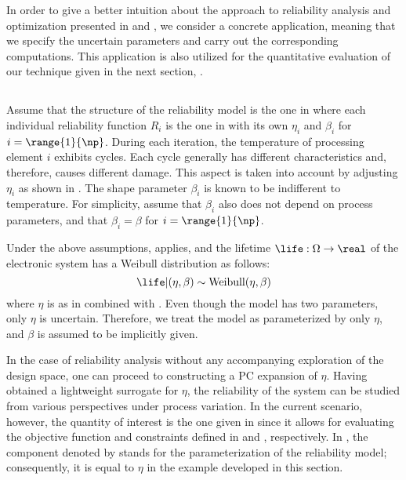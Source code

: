 In order to give a better intuition about the approach to reliability analysis
and optimization presented in  and
, we consider a concrete application,
meaning that we specify the uncertain parameters and carry out the corresponding
computations. This application is also utilized for the quantitative evaluation
of our technique given in the next section, .

\subsection{\problemtitle}

Assume that the structure of the reliability model is the one in
 where each individual reliability function $R_i$ is the
one in  with its own $\eta_i$ and $\beta_i$ for $i =
\range{1}{\np}$. During each iteration, the temperature of processing element
$i$ exhibits  cycles. Each cycle generally has different characteristics
and, therefore, causes different damage. This aspect is taken into account by
adjusting $\eta_i$ as shown in . The shape parameter
$\beta_i$ is known to be indifferent to temperature. For simplicity, assume that
$\beta_i$ also does not depend on process parameters, and that $\beta_i = \beta$
for $i = \range{1}{\np}$.

Under the above assumptions,  applies, and the
lifetime $\life: \Omega \to \real$ of the electronic system has a Weibull
distribution as follows:
\[
  \life | (\eta, \beta) \sim \mathrm{Weibull}(\eta, \beta)
\]
where $\eta$ is as in  combined with
. Even though the model has two parameters, only
$\eta$ is uncertain. Therefore, we treat the model as parameterized by only
$\eta$, and $\beta$ is assumed to be implicitly given.

In the case of reliability analysis without any accompanying exploration of the
design space, one can proceed to constructing a \ac{PC} expansion of $\eta$.
Having obtained a lightweight surrogate for $\eta$, the reliability of the
system can be studied from various perspectives under process variation. In the
current scenario, however, the quantity of interest \g is the one given in
 since it allows for evaluating the objective
function and constraints defined in  and
, respectively. In
, the component denoted by \life stands for
the parameterization of the reliability model; consequently, it is equal to
$\eta$ in the example developed in this section.

